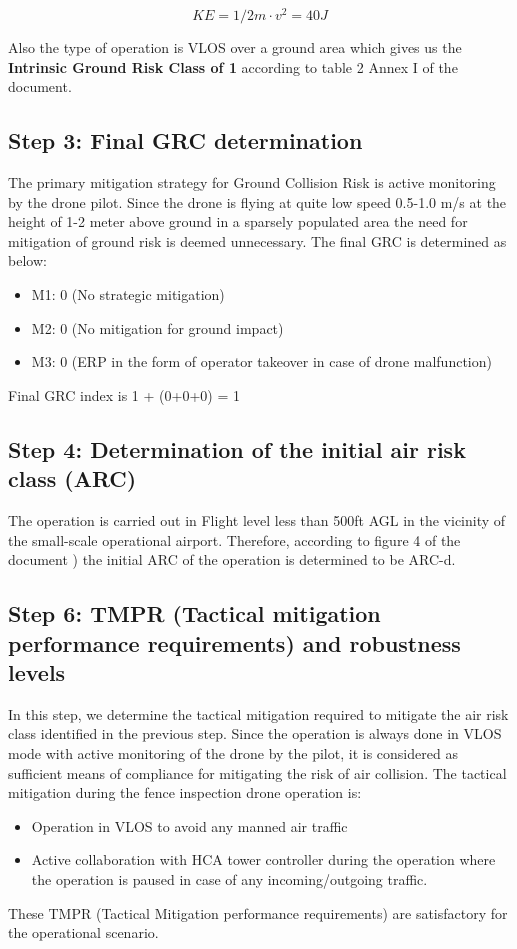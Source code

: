 \documentclass[../Head/Main.tex]{subfiles}
\begin{document}
\[ KE = 1/2 m\cdot v^2 = 40 J \]

Also the type of operation is VLOS over a ground area which gives us the \textbf{Intrinsic Ground Risk Class of 1} according to table 2 Annex I of the document. \cite{sora_doc}

\subsection{Step 3: Final GRC determination}

The primary mitigation strategy for Ground Collision Risk is active monitoring by the drone pilot. Since the drone is flying at quite low speed 0.5-1.0 m/s at the height of 1-2 meter above ground in a sparsely populated area the need for mitigation of ground risk is deemed unnecessary.
The final GRC is determined as below:
\begin{itemize}
\item M1: 0 (No strategic mitigation)
\item M2: 0 (No mitigation for ground impact)
\item M3: 0 (ERP in the form of operator takeover in case of drone malfunction)
\end{itemize}
Final GRC  index is 1 + (0+0+0) = 1

\subsection{Step 4: Determination of the initial air risk class (ARC)}
The operation is carried out in Flight level less than 500ft AGL in the vicinity of the small-scale operational airport. Therefore, according to figure 4 of the document \cite{sora_doc}) the initial ARC of the operation is determined to be ARC-d.

\subsection{Step 6: TMPR (Tactical mitigation performance requirements) and robustness levels}
In this step, we determine the tactical mitigation required to mitigate the air risk class identified in the previous step. Since the operation is always done in VLOS mode with active monitoring of the drone by the pilot, it is considered as sufficient means of compliance for mitigating the risk of air collision. The tactical mitigation during the fence inspection drone operation is:
\begin{itemize}
    \item Operation in VLOS to avoid any manned air traffic
    \item Active collaboration with HCA tower controller during the operation where the operation is paused in case of any incoming/outgoing traffic.
    
\end{itemize}
These TMPR (Tactical Mitigation performance requirements) are satisfactory for the operational scenario.
\end{document}
